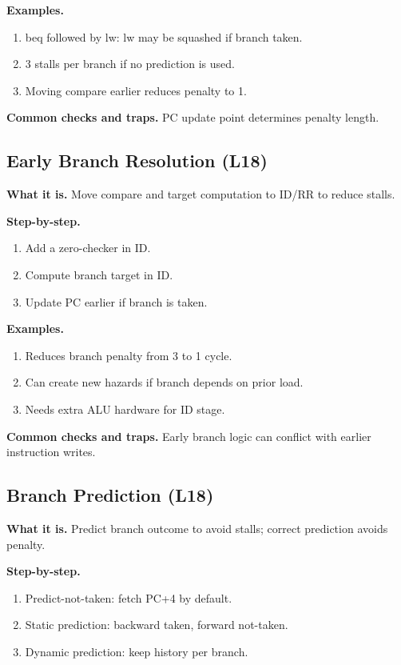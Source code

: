 \documentclass[11pt]{article}
\begin{document}
\textbf{Examples.}
\begin{enumerate}[leftmargin=*]
  \item beq followed by lw: lw may be squashed if branch taken.
  \item 3 stalls per branch if no prediction is used.
  \item Moving compare earlier reduces penalty to 1.
\end{enumerate}

\textbf{Common checks and traps.} PC update point determines penalty length.

\begin{figure}[h]
\centering
{}
\end{figure}

\subsection{Early Branch Resolution (L18)}
\textbf{What it is.} Move compare and target computation to ID/RR to reduce stalls.

\textbf{Step-by-step.}
\begin{enumerate}[leftmargin=*]
  \item Add a zero-checker in ID.
  \item Compute branch target in ID.
  \item Update PC earlier if branch is taken.
\end{enumerate}

\textbf{Examples.}
\begin{enumerate}[leftmargin=*]
  \item Reduces branch penalty from 3 to 1 cycle.
  \item Can create new hazards if branch depends on prior load.
  \item Needs extra ALU hardware for ID stage.
\end{enumerate}

\textbf{Common checks and traps.} Early branch logic can conflict with earlier instruction writes.

\subsection{Branch Prediction (L18)}
\textbf{What it is.} Predict branch outcome to avoid stalls; correct prediction avoids penalty.

\textbf{Step-by-step.}
\begin{enumerate}[leftmargin=*]
  \item Predict-not-taken: fetch PC+4 by default.
  \item Static prediction: backward taken, forward not-taken.
  \item Dynamic prediction: keep history per branch.
\end{enumerate}
\end{document}
